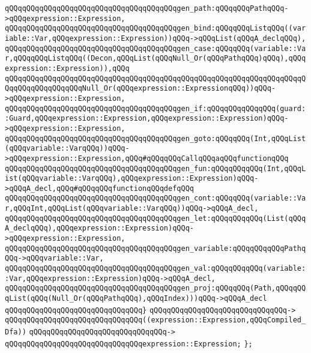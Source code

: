 \verb|qQQqqQQqqQQqqQQqqQQqqQQqqQQqqQQqqQQqqQQqgen_path:qQQqqQQqPathqQQq->qQQqexpression::Expression,|\newline
\verb|qQQqqQQqqQQqqQQqqQQqqQQqqQQqqQQqqQQqqQQqgen_bind:qQQqqQQqListqQQq((variable::Var,qQQqexpression::Expression))qQQq->qQQqList(qQQqA_declqQQq),|\newline
\verb|qQQqqQQqqQQqqQQqqQQqqQQqqQQqqQQqqQQqqQQqgen_case:qQQqqQQq(variable::Var,qQQqqQQqListqQQq((Decon,qQQqList(qQQqNull_Or(qQQqPathqQQq)qQQq),qQQqexpression::Expression)),qQQq|\newline
\verb|qQQqqQQqqQQqqQQqqQQqqQQqqQQqqQQqqQQqqQQqqQQqqQQqqQQqqQQqqQQqqQQqqQQqqQQqqQQqqQQqqQQqqQQqNull_Or(qQQqexpression::ExpressionqQQq))qQQq->qQQqexpression::Expression,|\newline
\verb|qQQqqQQqqQQqqQQqqQQqqQQqqQQqqQQqqQQqqQQqgen_if:qQQqqQQqqQQqqQQq(guard::Guard,qQQqexpression::Expression,qQQqexpression::Expression)qQQq->qQQqexpression::Expression,|\newline
\verb|qQQqqQQqqQQqqQQqqQQqqQQqqQQqqQQqqQQqqQQqgen_goto:qQQqqQQq(Int,qQQqList(qQQqvariable::VarqQQq))qQQq->qQQqexpression::Expression,qQQq#qQQqqQQqCallqQQqaqQQqfunctionqQQq|\newline
\verb|qQQqqQQqqQQqqQQqqQQqqQQqqQQqqQQqqQQqqQQqgen_fun:qQQqqQQqqQQq(Int,qQQqList(qQQqvariable::VarqQQq),qQQqexpression::Expression)qQQq->qQQqA_decl,qQQq#qQQqqQQqfunctionqQQqdefqQQq|\newline
\verb|qQQqqQQqqQQqqQQqqQQqqQQqqQQqqQQqqQQqqQQqgen_cont:qQQqqQQq(variable::Var,qQQqInt,qQQqList(qQQqvariable::VarqQQq))qQQq->qQQqA_decl,|\newline
\verb|qQQqqQQqqQQqqQQqqQQqqQQqqQQqqQQqqQQqqQQqgen_let:qQQqqQQqqQQq(List(qQQqA_declqQQq),qQQqexpression::Expression)qQQq->qQQqexpression::Expression,|\newline
\verb|qQQqqQQqqQQqqQQqqQQqqQQqqQQqqQQqqQQqqQQqgen_variable:qQQqqQQqqQQqPathqQQq->qQQqvariable::Var,|\newline
\verb|qQQqqQQqqQQqqQQqqQQqqQQqqQQqqQQqqQQqqQQqgen_val:qQQqqQQqqQQq(variable::Var,qQQqexpression::Expression)qQQq->qQQqA_decl,|\newline
\verb|qQQqqQQqqQQqqQQqqQQqqQQqqQQqqQQqqQQqqQQqgen_proj:qQQqqQQq(Path,qQQqqQQqList(qQQq(Null_Or(qQQqPathqQQq),qQQqIndex)))qQQq->qQQqA_decl|\newline
\verb|qQQqqQQqqQQqqQQqqQQqqQQqqQQqqQQq}|\newline
\verb|qQQqqQQqqQQqqQQqqQQqqQQqqQQqqQQq->|\newline
\verb|qQQqqQQqqQQqqQQqqQQqqQQqqQQqqQQq((expression::Expression,qQQqCompiled_Dfa))|\newline
\verb|qQQqqQQqqQQqqQQqqQQqqQQqqQQqqQQq->|\newline
\verb|qQQqqQQqqQQqqQQqqQQqqQQqqQQqqQQqexpression::Expression;|\newline
\verb|};|\newline

